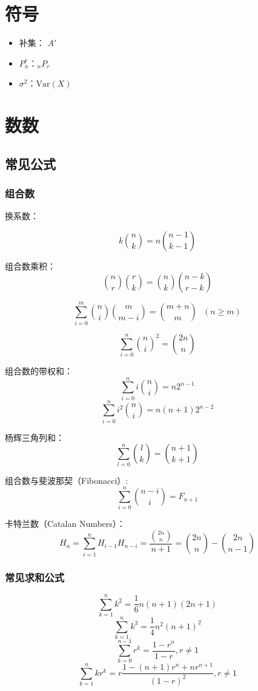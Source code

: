 \documentclass[9pt,landscape]{article}
\begin{document}
\begin{multicols}{3}

\columnseprule=0.25pt

\section{符号}
\begin{itemize}
	\item 补集： $A'$
	\item $P_n^r$：$_nP_r$
	\item $\sigma^2$：$\text{Var}(X)$
\end{itemize}

\section{数数}

\subsection{常见公式}

\subsubsection{组合数}

换系数：

$$k \binom{n}{k} = n \binom{n-1}{k-1}$$

组合数乘积：
$$\binom{n}{r}\binom{r}{k} = \binom{n}{k}\binom{n-k}{r-k}$$

$$\sum_{i=0}^m \binom{n}{i}\binom{m}{m-i} = \binom{m+n}{m}\ \ \ (n \geq m)$$

$$\sum_{i=0}^n\binom{n}{i}^2=\binom{2n}{n}$$

组合数的带权和：
$$ \sum_{i=0}^ni\binom{n}{i}=n2^{n-1}$$
$$ \sum_{i=0}^ni^2\binom{n}{i}=n(n+1)2^{n-2}$$

杨辉三角列和：
$$ \sum_{l=0}^n\binom{l}{k} = \binom{n+1}{k+1}$$

组合数与斐波那契（Fibonacci）:
$$ \sum_{i=0}^n\binom{n-i}{i}=F_{n+1}$$

卡特兰数（Catalan Numbers）：
$$H_n=\sum_{i=1}^nH_{i-1}H_{n-i}=\frac{\binom{2n}{n}}{n+1}=\binom{2n}{n}-\binom{2n}{n-1}$$

\subsubsection{常见求和公式}

\begin{equation*}
	\sum_{k=1}^{n}k^2=\frac{1}{6}n(n+1)(2n+1)
\end{equation*}
\begin{equation*}
	\sum_{k=1}^{n}k^3=\frac{1}{4}n^2(n+1)^2
\end{equation*}
\begin{equation*}
	\sum_{k=0}^{n-1}r^k=\frac{1-r^n}{1-r}, r\neq 1
\end{equation*}
\begin{equation*}
	\sum_{k=1}^{n}kr^k=r\frac{1-(n+1)r^n+nr^{n+1}}{(1-r)^2}, r\neq 1
\end{equation*}


\end{multicols}
\end{document}
